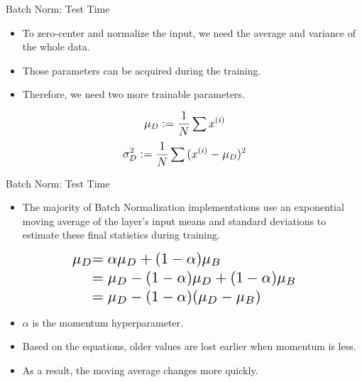 \documentclass[compress,oilve,t]{beamer}
\begin{document}
\begin{frame}{Batch Norm: Test Time}
	\begin{itemize}
		\item To zero-center and normalize the input, we need the average and variance of the whole data.
		\medskip
		\item Those parameters can be acquired during the training.
		\medskip
		\item Therefore, we need two more trainable parameters.
	\end{itemize}
	\vspace{0.1\textheight}
	\begin{equation*}
		\mathlarger{
			\mu_D := \frac{1}{N} \sum{x^{(i)}}
		}
	\end{equation*}
	\begin{equation*}
		\mathlarger{
			\sigma_D^2 := \frac{1}{N} \sum{(x^{(i)} - \mu_D)^2}
		}
	\end{equation*}
\end{frame}
\begin{frame}{Batch Norm: Test Time}
	\begin{itemize}
		\item The majority of Batch Normalization implementations use an exponential moving average of the layer's input means and standard deviations to estimate these final statistics during training.
	\end{itemize}
	\begin{align*}
		\scalebox{1.5}{$\mu_D $} & \scalebox{1.5}{$= \alpha \mu_D + (1 - \alpha) \mu_B$} \\
		& \scalebox{1.5}{$= \mu_D - (1 - \alpha) \mu_D + (1 - \alpha) \mu_B$} \\
		& \scalebox{1.5}{$= \mu_D - (1 - \alpha)(\mu_D - \mu_B)$}
	\end{align*}
	\begin{itemize}
		\item $\alpha$ is the momentum hyperparameter.
		\medskip
		\item Based on the equations, older values are lost earlier when momentum is less. 
		\item As a result, the moving average changes more quickly.
	\end{itemize}
\end{frame}
\end{document}
